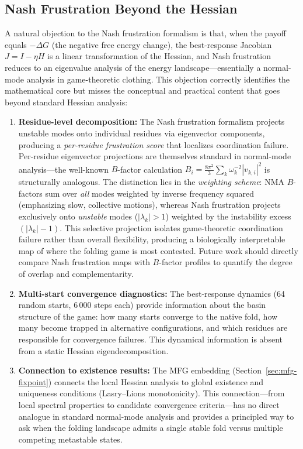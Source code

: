\documentclass[12pt,a4paper]{article}
\theoremstyle{remark}
\begin{document}
\subsection{Nash Frustration Beyond the Hessian}

A natural objection to the Nash frustration formalism is that, when the payoff equals $-\Delta G$ (the negative free energy change), the best-response Jacobian $J = I - \eta H$ is a linear transformation of the Hessian, and Nash frustration reduces to an eigenvalue analysis of the energy landscape---essentially a normal-mode analysis in game-theoretic clothing. This objection correctly identifies the mathematical core but misses the conceptual and practical content that goes beyond standard Hessian analysis:

\begin{enumerate}
    \item \textbf{Residue-level decomposition:} The Nash frustration formalism projects unstable modes onto individual residues via eigenvector components, producing a \emph{per-residue frustration score} that localizes coordination failure. Per-residue eigenvector projections are themselves standard in normal-mode analysis---the well-known $B$-factor calculation $B_i = \frac{8\pi^2}{3}\sum_k \omega_k^{-2}|v_{k,i}|^2$ is structurally analogous. The distinction lies in the \emph{weighting scheme}: NMA $B$-factors sum over \emph{all} modes weighted by inverse frequency squared (emphasizing slow, collective motions), whereas Nash frustration projects exclusively onto \emph{unstable} modes ($|\lambda_k|>1$) weighted by the instability excess $(|\lambda_k|-1)$. This selective projection isolates game-theoretic coordination failure rather than overall flexibility, producing a biologically interpretable map of where the folding game is most contested. Future work should directly compare Nash frustration maps with $B$-factor profiles to quantify the degree of overlap and complementarity.
    \item \textbf{Multi-start convergence diagnostics:} The best-response dynamics (64 random starts, 6\,000 steps each) provide information about the basin structure of the game: how many starts converge to the native fold, how many become trapped in alternative configurations, and which residues are responsible for convergence failures. This dynamical information is absent from a static Hessian eigendecomposition.
    \item \textbf{Connection to existence results:} The MFG embedding (Section~\ref{sec:mfg-fixpoint}) connects the local Hessian analysis to global existence and uniqueness conditions (Lasry--Lions monotonicity). This connection---from local spectral properties to candidate convergence criteria---has no direct analogue in standard normal-mode analysis and provides a principled way to ask when the folding landscape admits a single stable fold versus multiple competing metastable states.

\end{enumerate}
\end{document}

